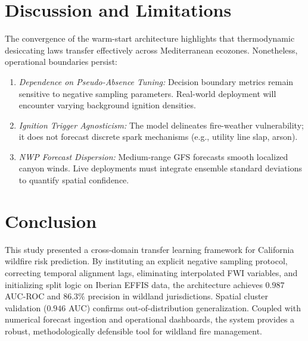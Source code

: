 \documentclass[journal]{IEEEtran}
\begin{document}
\section{Discussion and Limitations}
The convergence of the warm-start architecture highlights that thermodynamic desiccating laws transfer effectively across Mediterranean ecozones. Nonetheless, operational boundaries persist:
\begin{enumerate}
    \item \emph{\color{Maroon}Dependence on Pseudo-Absence Tuning:} Decision boundary metrics remain sensitive to negative sampling parameters. Real-world deployment will encounter varying background ignition densities.
    \item \emph{\color{Maroon}Ignition Trigger Agnosticism:} The model delineates fire-weather vulnerability; it does not forecast discrete spark mechanisms (e.g., utility line slap, arson).
    \item \emph{\color{Maroon}NWP Forecast Dispersion:} Medium-range GFS forecasts smooth localized canyon winds. Live deployments must integrate ensemble standard deviations to quantify spatial confidence.
\end{enumerate}

\section{Conclusion}
This study presented a cross-domain transfer learning framework for California wildfire risk prediction. By instituting an explicit negative sampling protocol, correcting temporal alignment lags, eliminating interpolated FWI variables, and initializing split logic on Iberian EFFIS data, the architecture achieves $0.987$ AUC-ROC and $86.3\%$ precision in wildland jurisdictions. Spatial cluster validation ($0.946$ AUC) confirms out-of-distribution generalization. Coupled with numerical forecast ingestion and operational dashboards, the system provides a robust, methodologically defensible tool for wildland fire management.
\end{document}
